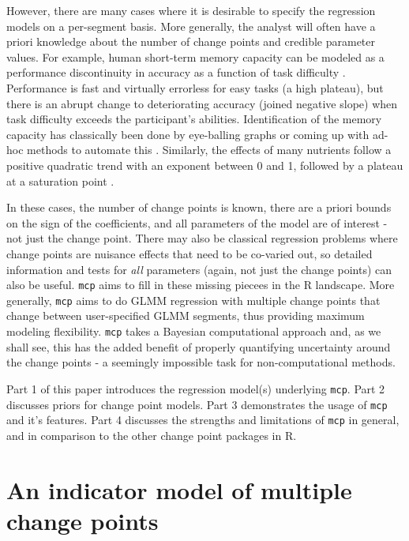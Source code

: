 \documentclass[
  american,
]{article}
\begin{document}
However, there are many cases where it is desirable to specify the regression models on a per-segment basis. More generally, the analyst will often have a priori knowledge about the number of change points and credible parameter values. For example, human short-term memory capacity can be modeled as a performance discontinuity in accuracy as a function of task difficulty \citep{cowan2000, camos2008, leibovich-raveh2018}. Performance is fast and virtually errorless for easy tasks (a high plateau), but there is an abrupt change to deteriorating accuracy (joined negative slope) when task difficulty exceeds the participant's abilities. Identification of the memory capacity has classically been done by eye-balling graphs or coming up with ad-hoc methods to automate this \citep{leibovich-raveh2018}. Similarly, the effects of many nutrients follow a positive quadratic trend with an exponent between 0 and 1, followed by a plateau at a saturation point \citep{pesti2009}.

In these cases, the number of change points is known, there are a priori bounds on the sign of the coefficients, and all parameters of the model are of interest - not just the change point. There may also be classical regression problems where change points are nuisance effects that need to be co-varied out, so detailed information and tests for \emph{all} parameters (again, not just the change points) can also be useful. \texttt{mcp} aims to fill in these missing piecees in the R landscape. More generally, \texttt{mcp} aims to do GLMM regression with multiple change points that change between user-specified GLMM segments, thus providing maximum modeling flexibility. \texttt{mcp} takes a Bayesian computational approach and, as we shall see, this has the added benefit of properly quantifying uncertainty around the change points - a seemingly impossible task for non-computational methods.

Part 1 of this paper introduces the regression model(s) underlying \texttt{mcp}. Part 2 discusses priors for change point models. Part 3 demonstrates the usage of \texttt{mcp} and it's features. Part 4 discusses the strengths and limitations of \texttt{mcp} in general, and in comparison to the other change point packages in R.

\hypertarget{an-indicator-model-of-multiple-change-points}{%
\section{An indicator model of multiple change points}\label{an-indicator-model-of-multiple-change-points}}
\end{document}
